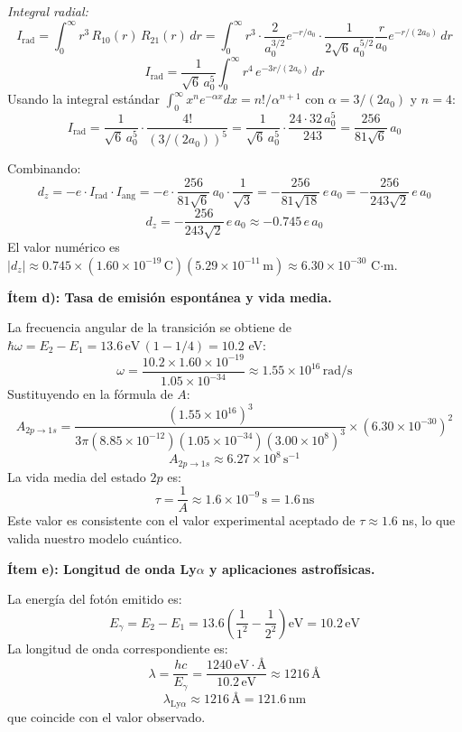 \documentclass[a4paper]{article}
\begin{document}
\textit{Integral radial:}
$$
I_{\text{rad}} = \int_0^\infty r^3\, R_{10}(r)\, R_{21}(r)\, dr = \int_0^\infty r^3 \cdot \frac{2}{a_0^{3/2}} e^{-r/a_0} \cdot \frac{1}{2\sqrt{6}\, a_0^{5/2}} \frac{r}{a_0} e^{-r/(2a_0)}\, dr
$$
$$
I_{\text{rad}} = \frac{1}{\sqrt{6}\, a_0^5} \int_0^\infty r^4\, e^{-3r/(2a_0)}\, dr
$$
Usando la integral estándar $\int_0^\infty x^n e^{-\alpha x} dx = n!/\alpha^{n+1}$ con $\alpha = 3/(2a_0)$ y $n=4$:
$$
I_{\text{rad}} = \frac{1}{\sqrt{6}\, a_0^5} \cdot \frac{4!}{(3/(2a_0))^5} = \frac{1}{\sqrt{6}\, a_0^5} \cdot \frac{24 \cdot 32\, a_0^5}{243} = \frac{256}{81\sqrt{6}}\, a_0
$$

Combinando:
$$
d_z = -e \cdot I_{\text{rad}} \cdot I_{\text{ang}} = -e \cdot \frac{256}{81\sqrt{6}}\, a_0 \cdot \frac{1}{\sqrt{3}} = -\frac{256}{81\sqrt{18}}\, e\, a_0 = -\frac{256}{243\sqrt{2}}\, e\, a_0
$$
$$
\boxed{d_z = -\frac{256}{243\sqrt{2}}\, e\, a_0 \approx -0.745\, e\, a_0}
$$
El valor numérico es $|d_z| \approx 0.745 \times (1.60 \times 10^{-19}\,\text{C})(5.29 \times 10^{-11}\,\text{m}) \approx 6.30 \times 10^{-30}$ C$\cdot$m.

\textbf{Ítem d): Tasa de emisión espontánea y vida media.}

La frecuencia angular de la transición se obtiene de $\hbar\omega = E_2 - E_1 = 13.6\,\text{eV}\,(1 - 1/4) = 10.2$ eV:
$$
\omega = \frac{10.2 \times 1.60 \times 10^{-19}}{1.05 \times 10^{-34}} \approx 1.55 \times 10^{16}\,\text{rad/s}
$$
Sustituyendo en la fórmula de $A$:
$$
A_{2p \to 1s} = \frac{(1.55 \times 10^{16})^3}{3\pi (8.85 \times 10^{-12})(1.05 \times 10^{-34})(3.00 \times 10^8)^3} \times (6.30 \times 10^{-30})^2
$$
$$
A_{2p \to 1s} \approx 6.27 \times 10^8\,\text{s}^{-1}
$$
La vida media del estado $2p$ es:
$$
\boxed{\tau = \frac{1}{A} \approx 1.6 \times 10^{-9}\,\text{s} = 1.6\,\text{ns}}
$$
Este valor es consistente con el valor experimental aceptado de $\tau \approx 1.6$ ns, lo que valida nuestro modelo cuántico.

\textbf{Ítem e): Longitud de onda Ly$\alpha$ y aplicaciones astrofísicas.}

La energía del fotón emitido es:
$$
E_\gamma = E_2 - E_1 = 13.6\left(\frac{1}{1^2} - \frac{1}{2^2}\right)\text{eV} = 10.2\,\text{eV}
$$
La longitud de onda correspondiente es:
$$
\lambda = \frac{hc}{E_\gamma} = \frac{1240\,\text{eV}\cdot\text{\AA}}{10.2\,\text{eV}} \approx 1216\,\text{\AA}
$$
$$
\boxed{\lambda_{\text{Ly}\alpha} \approx 1216\,\text{\AA} = 121.6\,\text{nm}}
$$
que coincide con el valor observado.
\end{document}
